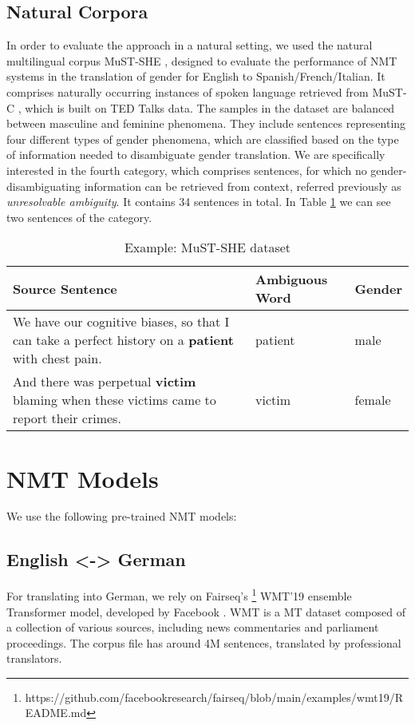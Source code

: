 \subsection{Natural Corpora}
\label{sec:Setup:Natural_Corpora}

In order to evaluate the approach in a natural setting, we used the natural multilingual corpus MuST-SHE \parencite{MuST-SHE}, designed to evaluate the performance of NMT systems in the translation of gender for English to Spanish/French/Italian. It comprises naturally occurring instances of spoken language retrieved from MuST-C \parencite{MuST-C}, which is built on TED Talks data. The samples in the dataset are balanced between masculine and feminine phenomena. They include sentences representing four different types of gender phenomena, which are classified based
on the type of information needed to disambiguate gender translation. We are specifically interested in the fourth category, which comprises sentences, for which no gender-disambiguating information can be retrieved from context, referred previously as \textit{unresolvable ambiguity}. It contains 34 sentences in total. In Table \ref{tab:mustshe} we can see two sentences of the category. 

\begin{table} 
    \label{tab:mustshe}
    \begin{tabularx}{\linewidth}{|X|l|l|}
        \hline
        \textbf{Source Sentence} & \textbf{Ambiguous Word} & \textbf{Gender} \\ \hline
        We have our cognitive biases, so that I can take a perfect history on a \textbf{patient} with chest pain. & patient & male \\ \hline
        And there was perpetual \textbf{victim} blaming when these victims came to report their crimes. & victim & female \\ \hline
    \end{tabularx}
    \caption{Example: MuST-SHE dataset}
\end{table}

\section{NMT Models}
\label{sec:Setup:Models}

We use the following pre-trained NMT models:

\subsection{English <-> German}
For translating into German, we rely on Fairseq's \footnote{https://github.com/facebookresearch/fairseq/blob/main/examples/wmt19/README.md} WMT’19 ensemble Transformer model, developed by Facebook \parencite{WMT19}. WMT is a MT dataset composed of a collection of various sources, including news commentaries and parliament proceedings. The corpus file has around 4M sentences, translated by professional translators.

